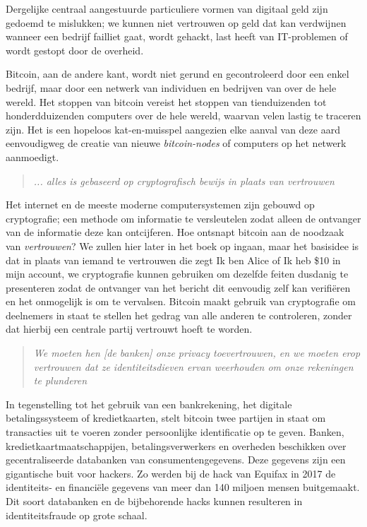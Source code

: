 Dergelijke centraal aangestuurde particuliere vormen van digitaal geld zijn gedoemd te mislukken; we kunnen niet vertrouwen op geld dat kan verdwijnen wanneer een bedrijf failliet gaat, wordt gehackt, last heeft van IT-problemen of wordt gestopt door de overheid.

Bitcoin, aan de andere kant, wordt niet gerund en gecontroleerd door een enkel bedrijf, maar door een netwerk van individuen en bedrijven van over de hele wereld. Het stoppen van bitcoin vereist het stoppen van tienduizenden tot honderdduizenden computers over de hele wereld, waarvan velen lastig te traceren zijn. Het is een hopeloos kat-en-muisspel aangezien elke aanval van deze aard eenvoudigweg de creatie van nieuwe \textit{bitcoin-nodes} of computers op het netwerk aanmoedigt.

\begin{quote}
\textit{ ... alles is gebaseerd op cryptografisch bewijs in plaats van vertrouwen}
\end{quote}

Het internet en de meeste moderne computersystemen zijn gebouwd op cryptografie; een methode om informatie te versleutelen zodat alleen de ontvanger van de informatie deze kan ontcijferen. Hoe ontsnapt bitcoin aan de noodzaak van \textit{vertrouwen}? We zullen hier later in het boek op ingaan, maar het basisidee is dat in plaats van iemand te vertrouwen die zegt \textquotedbl{}Ik ben Alice\textquotedbl{} of \textquotedbl{}Ik heb \$10 in mijn account\textquotedbl{}, we cryptografie kunnen gebruiken om dezelfde feiten dusdanig te presenteren zodat de ontvanger van het bericht dit eenvoudig zelf kan verifiëren en het onmogelijk is om te vervalsen. Bitcoin maakt gebruik van cryptografie om deelnemers in staat te stellen het gedrag van alle anderen te controleren, zonder dat hierbij een centrale partij vertrouwt hoeft te worden.

\begin{quote}
\textit{We moeten hen [de banken] onze privacy toevertrouwen, en we moeten erop vertrouwen dat ze identiteitsdieven ervan weerhouden om onze rekeningen te plunderen}
\end{quote}

In tegenstelling tot het gebruik van een bankrekening, het digitale betalingssysteem of kredietkaarten, stelt bitcoin twee partijen in staat om transacties uit te voeren zonder persoonlijke identificatie op te geven. Banken, kredietkaartmaatschappijen, betalingsverwerkers en overheden beschikken over gecentraliseerde databanken van consumentengegevens. Deze gegevens zijn een gigantische buit voor hackers. Zo werden bij de hack van Equifax in 2017 de identiteits- en financiële gegevens van meer dan 140 miljoen mensen buitgemaakt. Dit soort databanken en de bijbehorende hacks kunnen resulteren in identiteitsfraude op grote schaal. 

